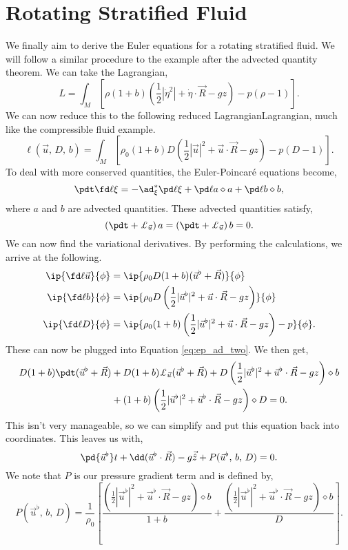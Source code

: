 
\section{Rotating Stratified Fluid}
We finally aim to derive the Euler equations for a rotating stratified fluid. We will follow a similar procedure to the example after the advected quantity theorem. We can take the Lagrangian,
$$ L = \int_M \left[ \rho (1 + b)\left( \frac{1}{2}|\dot\eta^2| + \dot \eta \cdot \vec R - gz \right) - p(\rho - 1) \right]. $$
We can now reduce this to the following reduced LagrangianLagrangian, much like the compressible fluid example.
$$ \ell(\vec u,\, D,\, b) = \int_M \left[ \rho_0(1 + b)D \left( \frac{1}{2}|\vec u|^2 + \vec u \cdot \vec R - gz \right) - p(D-1) \right]. $$
To deal with more conserved quantities, the Euler-Poincar\'e equations become,
\begin{equation}
  \pdt \fd \ell \xi = -\ad^*_\xi \pd \ell \xi + \pd \ell a \diamond a + \pd \ell b \diamond b,\label{eq:ep_ad_two}
\end{equation}
where $a$ and $b$ are advected quantities. These advected quantities satisfy,
$$ \left( \pdt + \pounds_{\vec u} \right)a = \left( \pdt + \pounds_{\vec u} \right)b = 0. $$
\noindent
We can now find the variational derivatives. By performing the calculations, we arrive at the following.
\begin{align*}
  \ip{\fd \ell {\vec u}}{\phi} &= \ip{\rho_0 D (1 + b)(\vec u^\flat + \vec R )}{\phi} \\
  \ip{\fd \ell b}{\phi} &= \ip{\rho_0 D \left( \frac{1}{2}|\vec u^\flat|^2 + \vec u \cdot \vec R - gz \right)}{\phi} \\
  \ip{\fd \ell D}{\phi} &= \ip{\rho_0 (1+b) \left( \frac{1}{2}|\vec u^\flat|^2 + \vec u \cdot \vec R - gz \right) - p}{\phi}.
\end{align*}
These can now be plugged into Equation \eqref{eq:ep_ad_two}. We then get,
\begin{align*}
  D(1 + b)\pdt (\vec u^\flat + \vec R) &+ D(1 + b)\pounds_{\vec u} (\vec u^\flat + \vec R) + D\left(\frac{1}{2}|\vec u^\flat|^2 + \vec u^\flat \cdot \vec R - gz\right) \diamond b \\
  &+ (1+ b)\left(\frac{1}{2}|\vec u^\flat|^2 + \vec u^\flat \cdot \vec R - gz\right) \diamond D = 0.
\end{align*}
This isn't very manageable, so we can simplify and put this equation back into coordinates. This leaves us with,
$$ \pd {\vec u^\flat} t + \dd (\vec u^\flat \cdot \vec R) - g\vec {\hat z} + P(\vec u^\flat,\, b,\, D) = 0. $$
We note that $P$ is our pressure gradient term and is defined by,
$$ P(\vec u^\flat,\, b,\, D) = \frac{1}{\rho_0}\left[ \frac{\left( \frac{1}{2}|\vec u^\flat|^2 + \vec u^\flat \cdot \vec R - gz \right)\diamond b}{1 + b} + \frac{\left( \frac{1}{2}|\vec u^\flat|^2 + \vec u^\flat \cdot \vec R - gz \right)\diamond b}{D} \right]. $$

